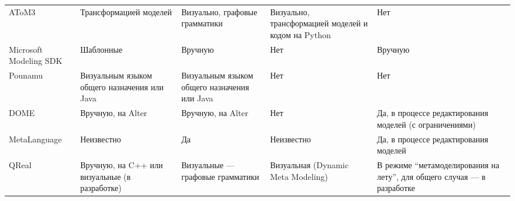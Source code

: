 \begin{table}[ht]
\begin{small}
\begin{longtabu} {| X[1 l p] | X[1 l p] | X[1 l p] | X[1 l p] | X[1 l p] |}
		AToM3                        & Трансформацией моделей                        & Визуально, графовые грамматики                 & Визуально, трансформацией моделей и кодом на Python & Нет                                                                        \\
		Microsoft Modeling SDK       & Шаблонные                                     & Вручную                                        & Нет                                                 & Вручную                                                                    \\
		Pounamu                      & Визуальным языком общего назначения или Java  & Визуальным языком общего назначения или Java   & Нет                                                 & Нет                                                                        \\
		DOME                         & Вручную, на Alter                             & Вручную, на Alter                              & Нет                                                 & Да, в процессе редактирования моделей (с ограничениями)                    \\
		MetaLanguage                 & Неизвестно                                    & Да                                             & Неизвестно                                          & Да, в процессе редактирования моделей                                      \\
		 QReal  & Вручную, на C++ или визуальные (в разработке) & Визуальные --- графовые грамматики             & Визуальная (Dynamic Meta Modeling)                  & В режиме "`метамоделирования на лету"', для общего случая --- в разработке
		\label{tab:existingPlatformsAdditional}
	\end{longtabu}
\end{small}
\end{table}

